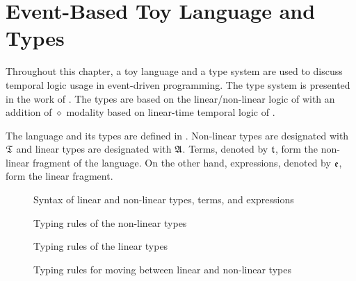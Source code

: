 \section{Event-Based Toy Language and Types}

Throughout this chapter, a toy language and a type system are used to discuss temporal logic usage in event-driven programming. The type system is presented in the work of \cite{Paykin2016TheEO}. The types are based on the linear/non-linear logic of \cite{DBLP:conf/csl/Benton94} with an addition of $\diamond$ modality based on linear-time temporal logic of \cite{DBLP:conf/focs/Pnueli77}.

The language and its types are defined in . Non-linear types are designated with $\mathfrak{T}$ and linear types are designated with $\mathfrak{A}$. Terms, denoted by $\mathfrak{t}$, form the non-linear fragment of the language. On the other hand, expressions, denoted by $\mathfrak{e}$, form the linear fragment.

\begin{figure}
    \centering
    
    \caption{Syntax of linear and non-linear types, terms, and expressions}
    \label{fig:syntax-of-types-terms-expressions}
\end{figure}

\begin{figure}
    \centering
    
    \caption{Typing rules of the non-linear types}
    \label{fig:typing-rules-for-nonlinear-types}
\end{figure}

\begin{figure}
    \centering
    
    \caption{Typing rules of the linear types}
    \label{fig:typing-rules-for-linear-types}
\end{figure}

\begin{figure}
    \centering
    
    \caption{Typing rules for moving between linear and non-linear types}
    \label{fig:typing-rules-for-linear-and-nonlinear-types}
\end{figure}

